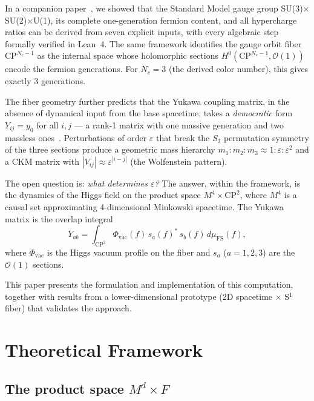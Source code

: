 \documentclass[12pt,a4paper]{article}
\begin{document}
In a companion paper~\cite{difiore_sm}, we showed that the Standard
Model gauge group SU(3)$\times$SU(2)$\times$U(1), its complete
one-generation fermion content, and all hypercharge ratios can be
derived from seven explicit inputs, with every algebraic step formally
verified in Lean~4.  The same framework identifies the gauge orbit
fiber $\text{CP}^{N_c-1}$ as the internal space whose holomorphic
sections $H^0(\text{CP}^{N_c-1}, \mathcal{O}(1))$ encode the fermion
generations.  For $N_c = 3$ (the derived color number), this gives
exactly 3 generations.

The fiber geometry further predicts that the Yukawa coupling matrix,
in the absence of dynamical input from the base spacetime, takes a
\emph{democratic} form $Y_{ij} = y_0$ for all $i, j$ --- a rank-1
matrix with one massive generation and two massless ones~\cite{difiore_sm}.
Perturbations of order $\varepsilon$ that break the $S_3$ permutation
symmetry of the three sections produce a geometric mass hierarchy
$m_1 : m_2 : m_3 \approx 1 : \varepsilon : \varepsilon^2$ and a CKM
matrix with $|V_{ij}| \approx \varepsilon^{|i-j|}$ (the Wolfenstein
pattern).

The open question is: \emph{what determines $\varepsilon$?}  The
answer, within the framework, is the dynamics of the Higgs field on
the product space $M^4 \times \text{CP}^2$, where $M^4$ is a causal
set approximating 4-dimensional Minkowski spacetime.  The Yukawa
matrix is the overlap integral
\begin{equation}
  Y_{ab} = \int_{\text{CP}^2} \Phi_{\text{vac}}(f)\, s_a(f)^*\, s_b(f)\, d\mu_{\text{FS}}(f),
  \label{eq:yukawa_overlap}
\end{equation}
where $\Phi_{\text{vac}}$ is the Higgs vacuum profile on the fiber and
$s_a$ ($a = 1, 2, 3$) are the $\mathcal{O}(1)$ sections.

This paper presents the formulation and implementation of this
computation, together with results from a lower-dimensional prototype
(2D spacetime $\times$ S$^1$ fiber) that validates the approach.

\section{Theoretical Framework}

\subsection{The product space $M^d \times F$}
\end{document}
